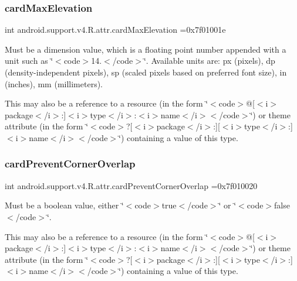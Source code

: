 \subsubsection{\texorpdfstring{card\+Max\+Elevation}{cardMaxElevation}}
{\footnotesize\ttfamily int android.\+support.\+v4.\+R.\+attr.\+card\+Max\+Elevation =0x7f01001e\hspace{0.3cm}{\ttfamily [static]}}

Must be a dimension value, which is a floating point number appended with a unit such as \char`\"{}$<$code$>$14.\+5sp$<$/code$>$\char`\"{}. Available units are\+: px (pixels), dp (density-\/independent pixels), sp (scaled pixels based on preferred font size), in (inches), mm (millimeters). 

This may also be a reference to a resource (in the form \char`\"{}$<$code$>$@\mbox{[}$<$i$>$package$<$/i$>$\+:\mbox{]}$<$i$>$type$<$/i$>$\+:$<$i$>$name$<$/i$>$$<$/code$>$\char`\"{}) or theme attribute (in the form \char`\"{}$<$code$>$?\mbox{[}$<$i$>$package$<$/i$>$\+:\mbox{]}\mbox{[}$<$i$>$type$<$/i$>$\+:\mbox{]}$<$i$>$name$<$/i$>$$<$/code$>$\char`\"{}) containing a value of this type. \mbox{\label{classandroid_1_1support_1_1v4_1_1R_1_1attr_a357305c5fc8069cdf7a25ce68201357f}} 
\subsubsection{\texorpdfstring{card\+Prevent\+Corner\+Overlap}{cardPreventCornerOverlap}}
{\footnotesize\ttfamily int android.\+support.\+v4.\+R.\+attr.\+card\+Prevent\+Corner\+Overlap =0x7f010020\hspace{0.3cm}{\ttfamily [static]}}

Must be a boolean value, either \char`\"{}$<$code$>$true$<$/code$>$\char`\"{} or \char`\"{}$<$code$>$false$<$/code$>$\char`\"{}. 

This may also be a reference to a resource (in the form \char`\"{}$<$code$>$@\mbox{[}$<$i$>$package$<$/i$>$\+:\mbox{]}$<$i$>$type$<$/i$>$\+:$<$i$>$name$<$/i$>$$<$/code$>$\char`\"{}) or theme attribute (in the form \char`\"{}$<$code$>$?\mbox{[}$<$i$>$package$<$/i$>$\+:\mbox{]}\mbox{[}$<$i$>$type$<$/i$>$\+:\mbox{]}$<$i$>$name$<$/i$>$$<$/code$>$\char`\"{}) containing a value of this type. \mbox{\label{classandroid_1_1support_1_1v4_1_1R_1_1attr_a83aa94d57c705df5e9ea503e23367e56}} 

